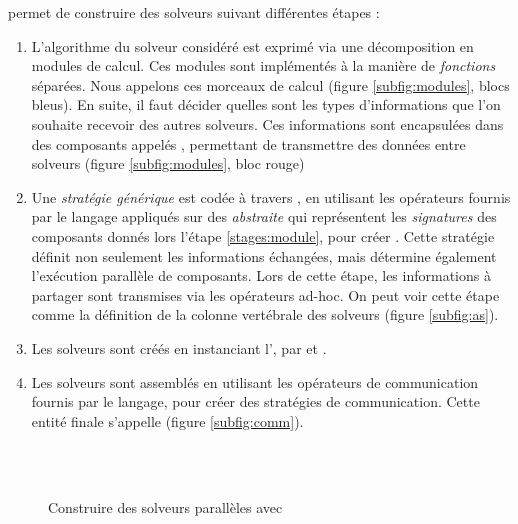 \posl{} permet de construire des solveurs suivant différentes étapes : 
\begin{enumerate}
\item  L'algorithme du solveur considéré est  exprimé via une décomposition  en modules de calcul. Ces modules sont implémentés à la   manière de {\it fonctions} séparées. Nous appelons \INTROom{} ces morceaux de calcul (figure \ref{subfig:modules}, blocs bleus). En suite, il faut décider  quelles  sont les  types d'informations que l'on souhaite  recevoir des autres solveurs.  Ces informations sont encapsulées  dans des composants appelés  \INTROopch{},  permettant  de transmettre  des  données entre solveurs (figure \ref{subfig:modules}, bloc rouge) \label{stages:module}

\item  Une {\it stratégie générique}  est codée  à travers  \posl{}, en utilisant les  opérateurs fournis par le langage appliqués  sur des \ms{} \textit{abstraite} qui représentent les \textit{signatures} des composants donnés lors l'étape \ref{stages:module}, pour créer \INTROass. Cette stratégie définit non seulement les informations échangées, mais détermine également l'exécution parallèle de composants. Lors  de cette  étape, les informations à partager sont  transmises via les opérateurs  ad-hoc. On peut voir cette étape comme la définition de la colonne vertébrale des solveurs (figure \ref{subfig:as}).

\item  Les solveurs sont créés en instanciant l'\as, par \oms{} et \opch. %

\item Les solveurs sont assemblés en utilisant les opérateurs de communication fournis par le langage, pour créer des stratégies de communication. Cette entité finale s'appelle \INTROsoset{} (figure \ref{subfig:comm}).
\end{enumerate}

\begin{figure}
	\centering
	\\
	\\
	\caption[]{Construire des solveurs parallèles avec \posl{}}
	\label{fig:posl}
\end{figure}%

